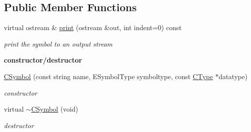 \subsection*{Public Member Functions}
\begin{DoxyCompactItemize}
\item 
virtual ostream \& \hyperlink{classCSymbol_acf224e60939a51f6b5b1341db0274dbe}{print} (ostream \&out, int indent=0) const 
\begin{DoxyCompactList}\small\item\em print the symbol to an output stream \end{DoxyCompactList}\end{DoxyCompactItemize}
\begin{Indent}{\bf constructor/destructor}\par
\begin{DoxyCompactItemize}
\item 
\hyperlink{classCSymbol_a329a43ab5446109d14f6f38061ab39fb}{C\-Symbol} (const string name, E\-Symbol\-Type symboltype, const \hyperlink{classCType}{C\-Type} $\ast$datatype)
\begin{DoxyCompactList}\small\item\em constructor \end{DoxyCompactList}\item 
\hypertarget{classCSymbol_ab00432bd7072d861f45a0eddcd9c24e3}{virtual \hyperlink{classCSymbol_ab00432bd7072d861f45a0eddcd9c24e3}{$\sim$\-C\-Symbol} (void)}\label{classCSymbol_ab00432bd7072d861f45a0eddcd9c24e3}

\begin{DoxyCompactList}\small\item\em destructor \end{DoxyCompactList}\end{DoxyCompactItemize}
\end{Indent}
